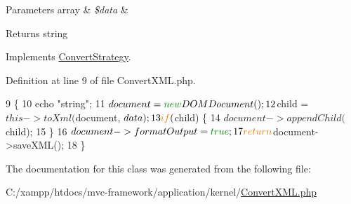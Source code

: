 \begin{DoxyParams}[1]{Parameters}
array & {\em \$data} & \\
\hline
\end{DoxyParams}
\begin{DoxyReturn}{Returns}
string 
\end{DoxyReturn}


Implements \hyperlink{interface_convert_strategy_a41444ea294bbd35a6c07ef4e9faeae10}{Convert\+Strategy}.



Definition at line 9 of file Convert\+X\+M\+L.\+php.


\begin{DoxyCode}
9                                    \{
10         echo \textcolor{stringliteral}{"string"};
11         $document = \textcolor{keyword}{new} DOMDocument();
12         $child = $this->toXml($document, $data);
13         \textcolor{keywordflow}{if} ($child) \{
14             $document->appendChild($child);
15         \}
16         $document->formatOutput = \textcolor{keyword}{true};
17         \textcolor{keywordflow}{return} $document->saveXML();
18     \}
\end{DoxyCode}


The documentation for this class was generated from the following file\+:\begin{DoxyCompactItemize}
\item 
C\+:/xampp/htdocs/mvc-\/framework/application/kernel/\hyperlink{_convert_x_m_l_8php}{Convert\+X\+M\+L.\+php}\end{DoxyCompactItemize}
